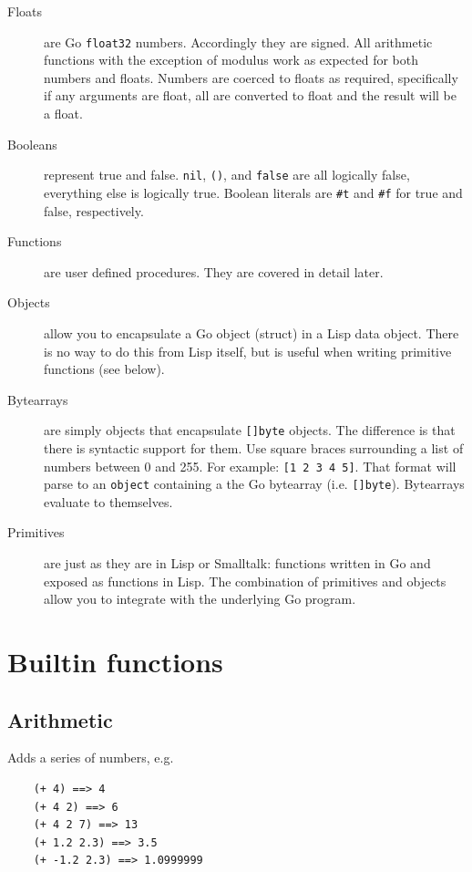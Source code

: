 \documentclass[12pt]{article}
\begin{document}
\begin{description}
\item[Floats] are Go \verb|float32| numbers. Accordingly they are
  signed. All arithmetic functions with the exception of modulus work
  as expected for both numbers and floats. Numbers are coerced to
  floats as required, specifically if any arguments are float, all are
  converted to float and the result will be a float.

\item[Booleans] represent true and false. \verb|nil|, \verb|()|, and
\verb|false| are all logically false, everything else is logically true.
Boolean literals are \verb|#t| and \verb|#f| for true and false,
respectively.

\item[Functions] are user defined procedures. They are covered in
detail later.

\item[Objects] allow you to encapsulate a Go object (struct) in a Lisp
  data object. There is no way to do this from Lisp itself, but is
  useful when writing primitive functions (see below).

\item[Bytearrays] are simply objects that encapsulate \verb|[]byte|
  objects. The difference is that there is syntactic support for them.
  Use square braces surrounding a list of numbers between 0 and 255.
  For example: \verb|[1 2 3 4 5]|. That format will parse to an
  \verb|object| containing a the Go bytearray (i.e. \verb|[]byte|).
  Bytearrays evaluate to themselves.

\item[Primitives] are just as they are in Lisp or Smalltalk: functions
  written in Go and exposed as functions in Lisp. The combination of
  primitives and objects allow you to integrate with the underlying Go
  program.
\end{description}

\section{Builtin functions}

\subsection{Arithmetic}


Adds a series of numbers, e.g.

\begin{verbatim}
    (+ 4) ==> 4
    (+ 4 2) ==> 6
    (+ 4 2 7) ==> 13
    (+ 1.2 2.3) ==> 3.5
    (+ -1.2 2.3) ==> 1.0999999
\end{verbatim}
\end{document}

